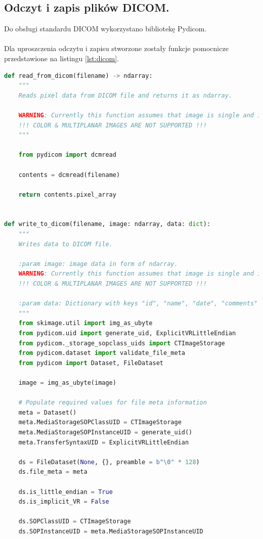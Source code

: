 \documentclass[a4paper, 11pt]{article}
\begin{document}
\subsection{Odczyt i zapis plików DICOM.}

Do obsługi standardu DICOM wykorzystano bibliotekę Pydicom.\\
\\
Dla uproszczenia odczytu i zapisu stworzone zostały funkcje pomocnicze przedstawione na listingu \ref{lst:dicom}.

\begin{lstlisting}[language = Python, caption = Obsługa DICOM, label = lst:dicom]
def read_from_dicom(filename) -> ndarray:
    """
    Reads pixel data from DICOM file and returns it as ndarray.

    WARNING: Currently this function assumes that image is single and in grayscale.
    !!! COLOR & MULTIPLANAR IMAGES ARE NOT SUPPORTED !!!
    """

    from pydicom import dcmread

    contents = dcmread(filename)

    return contents.pixel_array


def write_to_dicom(filename, image: ndarray, data: dict):
    """
    Writes data to DICOM file.

    :param image: image data in form of ndarray.
    WARNING: Currently this function assumes that image is single and in grayscale.
    !!! COLOR & MULTIPLANAR IMAGES ARE NOT SUPPORTED !!!

    :param data: Dictionary with keys "id", "name", "date", "comments" 
    """
    from skimage.util import img_as_ubyte
    from pydicom.uid import generate_uid, ExplicitVRLittleEndian
    from pydicom._storage_sopclass_uids import CTImageStorage
    from pydicom.dataset import validate_file_meta
    from pydicom import Dataset, FileDataset

    image = img_as_ubyte(image)

    # Populate required values for file meta information
    meta = Dataset()
    meta.MediaStorageSOPClassUID = CTImageStorage
    meta.MediaStorageSOPInstanceUID = generate_uid()
    meta.TransferSyntaxUID = ExplicitVRLittleEndian

    ds = FileDataset(None, {}, preamble = b"\0" * 128)
    ds.file_meta = meta

    ds.is_little_endian = True
    ds.is_implicit_VR = False

    ds.SOPClassUID = CTImageStorage
    ds.SOPInstanceUID = meta.MediaStorageSOPInstanceUID


\end{lstlisting}
\end{document}
